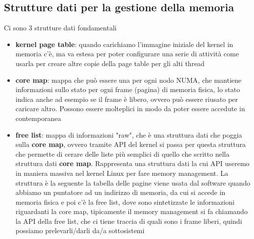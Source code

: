 \documentclass[12pt, oneside]{extbook}
\begin{document}
\subsection{Strutture dati per la gestione della memoria}
Ci sono 3 strutture dati fondamentali
\begin{itemize}
\item \textbf{kernel page table}: quando carichiamo l'immagine iniziale del kernel in memoria c'è, ma va estesa per poter configurare una serie di attività come usarla per creare altre copie della page table per gli alti thread
\item \textbf{core map}: mappa che può essere una per ogni nodo NUMA, che mantiene informazioni sullo stato per ogni frame (pagina) di memoria fisica, lo stato indica anche ad esempio se il frame è libero, ovvero può essere riusato per caricare altro. Possono essere molteplici in modo da poter essere accedute in contemporanea
\item \textbf{free list}: mappa di informazioni "raw", che è una struttura dati che poggia sulla \textbf{core map}, ovvero tramite API del kernel si passa per questa struttura che permette di cerare delle liste più semplici di quello che  scritto nella struttura dati \textbf{core map}. Rappresenta una struttura dati la cui API useremo in maniera massiva nel kernel Linux per fare memory management. La struttura è la seguente
la tabella delle pagine viene usata dal software quando abbiamo un puntatore ad un indirizzo di memoria, da cui si accede in memoria fisica e poi c'è la free list, dove sono sintetizzate le informazioni riguardanti la core map, tipicamente il memory management si fa chiamando la API della free list, che ci tiene traccia di quali sono i frame liberi, quindi possiamo prelevarli/darli da/a sottosistemi
\end{itemize}
\end{document}
